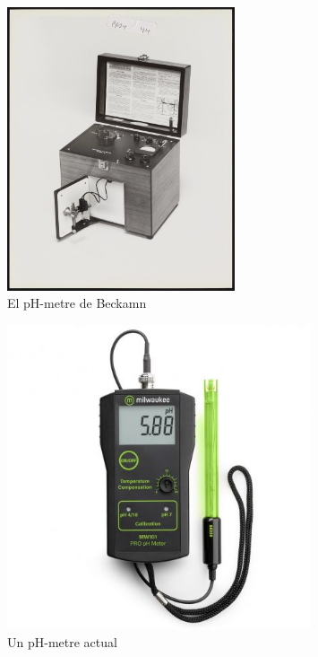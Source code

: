 \begin{minipage}[h]{0.5\textwidth}
  \begin{figure}[H]
  \centering
  \includegraphics[width=0.6\textwidth]{./Figures/modelbeckman.png}
  \caption{El pH-metre de Beckamn}
  \label{fig:pH-metre}
  \end{figure}
\end{minipage}
\begin{minipage}[h]{0.5\textwidth}
  \begin{figure}[H]
  \centering
  \includegraphics[width=0.8\textwidth]{./Figures/pHmetre.png}
  \caption{Un pH-metre actual}
  \label{fig:pH-metre}
  \end{figure}
\end{minipage}

